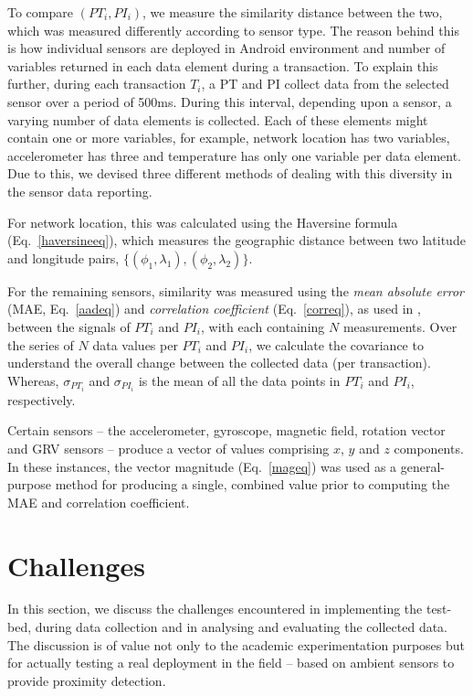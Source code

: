 \documentclass{article}
\begin{document}
To compare $(PT_{i}, PI_{i})$, we measure the similarity distance between the two, which was measured differently according to sensor type. The reason behind this is how individual sensors are deployed in Android environment and number of variables returned in each data element during a transaction. To explain this further, during each transaction $T_i$, a PT and PI collect data from the selected sensor over a period of 500ms. During this interval, depending upon a sensor, a varying number of data elements is collected.  Each of these elements might contain one or more variables, for example, network location has two variables, accelerometer has three and temperature has only one variable per data element. Due to this, we devised three different methods of dealing with this diversity in the sensor data reporting.    
 
For network location, this was calculated using the Haversine formula (Eq.\ \ref{haversineeq}), which measures the geographic distance between two latitude and longitude pairs, $\{(\phi_1, \lambda_1), (\phi_2, \lambda_2)\}$.

For the remaining sensors, similarity was measured using the \emph{mean absolute error} (MAE, Eq.\ \ref{aadeq}) and \emph{correlation coefficient} (Eq.\ \ref{correq}), as used in \cite{mehrnezhad2014tap}, between the signals of $PT_{i}$ and $PI_{i}$, with each containing $N$ measurements. Over the series of $N$ data values per $PT_{i}$ and $PI_{i}$, we calculate the covariance to understand the overall change between the collected data (per transaction). Whereas, $\sigma_{PT_{i}}$ and $\sigma_{PI_{i}}$ is the mean of all the data points in $PT_i$ and $PI_i$, respectively.

Certain sensors -- the accelerometer, gyroscope, magnetic field, rotation vector and GRV sensors -- produce a vector of values comprising $x$, $y$ and $z$ components. In these instances, the vector magnitude (Eq.\ \ref{mageq}) was used as a general-purpose method for producing a single, combined value prior to computing the MAE and correlation coefficient.

\section{Challenges}
\label{sec:ExperimentationandChallenges}

In this section, we discuss the challenges encountered in implementing the test-bed, during data collection and in analysing and evaluating the collected data. The discussion is of value not only to the academic experimentation purposes but for actually testing a real deployment in the field -- based on ambient sensors to provide proximity detection. 
\end{document}
